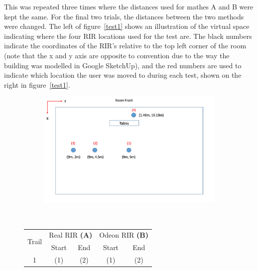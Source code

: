 \documentclass[../../main.tex]{subfiles}
\begin{document}
			This was repeated three times where the distances used for mathes A and B were kept the same. For the final two trials, the distances between the two methods were changed. The left of figure~\ref{test1} shows an illustration of the virtual space indicating where the four \ac{RIR} locations used for the test are. The black numbers indicate the coordinates of the \ac{RIR}'s  relative to the top left corner of the room (note that the x and y axis are opposite to convention due to the way the building was modelled in Google SketchUp), and the red numbers are used to indicate which location the user was moved to during each test, shown on the right in figure~\ref{test1}.



			\begin{figure}[H]
				\begin{minipage}{0.5\textwidth}
					\begin{figure}[H]
						\centerline{\includegraphics[scale = 0.5]{Sections/userTesting/images/test1/roomPositions3.png}}
					\end{figure}			
				\end{minipage}
				~
				\hspace{25mm}\begin{minipage}{0.5\textwidth}
				\begin{table}[H]
				    \begin{tabular}{|c|cc|cc|} \hline
				        \multirow{2}{*}{Trail} & \multicolumn{2}{c|}{Real RIR \textbf{(A)}} & \multicolumn{2}{c|}{Odeon RIR \textbf{(B)}}\\ \cline{2-5}
				            & Start & End & Start & End \\ \hline
				          1 & (1) & (2) & (1) & (2)\\

\end{tabular}
\end{table}
\end{minipage}
\end{figure}
\end{document}
